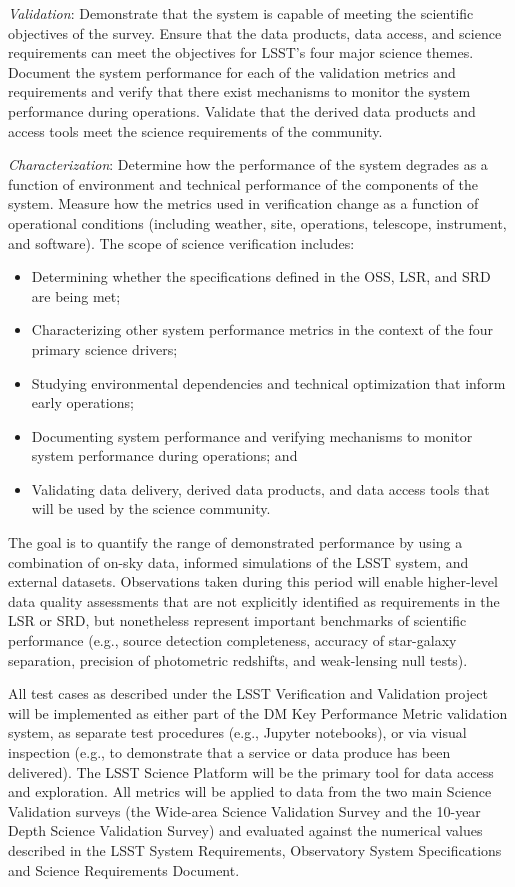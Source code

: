 \emph{Validation}: Demonstrate that the system is capable of meeting the scientific objectives of the survey. Ensure that the data products, data access, and science requirements can meet the objectives for LSST’s four major science themes. Document the system performance for each of the validation metrics and requirements and verify that there exist mechanisms to monitor the system performance during operations. Validate that the derived data products and access tools meet the science requirements of the community.

\emph{Characterization}: Determine how the performance of the system degrades as a function of environment and technical performance of the components of the system. Measure how the metrics used in verification change as a function of operational conditions (including weather, site, operations, telescope, instrument, and software).
The scope of science verification includes:

\begin{itemize}

	\item Determining whether the specifications defined in the OSS, LSR, and SRD are being met;
	\item Characterizing other system performance metrics in the context of the four primary science drivers;
	\item Studying environmental dependencies and technical optimization that inform early operations;
	\item Documenting system performance and verifying mechanisms to monitor system performance during operations; and
	\item Validating data delivery, derived data products, and data access tools that will be used by the science community.
	
\end{itemize}

The goal is to quantify the range of demonstrated performance by using a combination of on-sky data, informed simulations of the LSST system, and external datasets. Observations taken during this period will enable higher-level data quality assessments that are not explicitly identified as requirements in the LSR or SRD, but nonetheless represent important benchmarks of scientific performance (e.g., source detection completeness, accuracy of star-galaxy separation, precision of photometric redshifts, and weak-lensing null tests). 

All test cases as described under the LSST Verification and Validation  project will be implemented as either part of the DM Key Performance Metric validation system, as separate test procedures (e.g., Jupyter notebooks), or via visual inspection (e.g., to demonstrate that a service or data produce has been delivered). The LSST Science Platform will be the primary tool for data access and exploration. All metrics will be applied to data from the two main Science Validation surveys (the Wide-area Science Validation Survey and the 10-year Depth Science Validation Survey) and evaluated against the numerical values described in the LSST System Requirements, Observatory System Specifications and Science Requirements Document.

